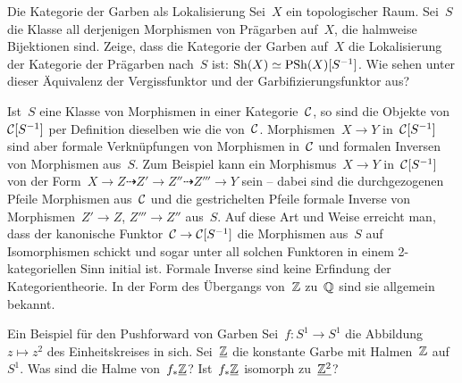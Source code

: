 \documentclass{uebblatt}
\begin{document}
\begin{aufgabe}{Die Kategorie der Garben als Lokalisierung}
Sei~$X$ ein topologischer Raum. Sei~$S$ die Klasse all
derjenigen Morphismen von Prägarben auf~$X$, die halmweise Bijektionen sind.
Zeige, dass die Kategorie der Garben auf~$X$ die Lokalisierung der Kategorie
der Prägarben nach~$S$ ist: $\mathrm{Sh}(X) \simeq \mathrm{PSh}(X)[S^{-1}]$. Wie sehen unter
dieser Äquivalenz der Vergissfunktor und der Garbifizierungsfunktor aus?

{\scriptsize Ist~$S$ eine Klasse von Morphismen in einer Kategorie~$\mathcal{C}$, so
sind die Objekte von~$\mathcal{C}[S^{-1}]$ per Definition dieselben wie die von~$\mathcal{C}$.
Morphismen~$X \to Y$ in~$\mathcal{C}[S^{-1}]$ sind aber formale Verknüpfungen von
Morphismen in~$\mathcal{C}$ und formalen Inversen von Morphismen aus~$S$. Zum Beispiel
kann ein Morphismus~$X \to Y$ in~$\mathcal{C}[S^{-1}]$ von der Form~$X \to Z
\dashrightarrow Z' \to Z'' \dashrightarrow Z''' \to Y$ sein -- dabei sind die
durchgezogenen Pfeile Morphismen aus~$\mathcal{C}$ und die gestrichelten Pfeile
formale Inverse von Morphismen~$Z' \to Z$, $Z''' \to Z''$ aus~$S$. Auf
diese Art und Weise erreicht man, dass der kanonische Funktor~$\mathcal{C} \to
\mathcal{C}[S^{-1}]$ die Morphismen aus~$S$ auf Isomorphismen schickt und sogar unter
all solchen Funktoren in einem 2-kategoriellen Sinn initial ist. Formale
Inverse sind keine Erfindung der Kategorientheorie. In der Form des Übergangs
von~$\mathbb{Z}$ zu~$\mathbb{Q}$ sind sie allgemein bekannt.
\par}
\end{aufgabe}

\begin{aufgabe}{Ein Beispiel für den Pushforward von Garben}
Sei~$f : S^1 \to S^1$ die Abbildung~$z \mapsto z^2$ des Einheitskreises in
sich. Sei~$\underline{\mathbb{Z}}$ die konstante Garbe mit Halmen~$\mathbb{Z}$ auf~$S^1$. Was sind
die Halme von~$f_*\underline{\mathbb{Z}}$? Ist~$f_*\underline{\mathbb{Z}}$ isomorph zu~$\underline{\mathbb{Z}^2}$?
\end{aufgabe}

\end{document}
